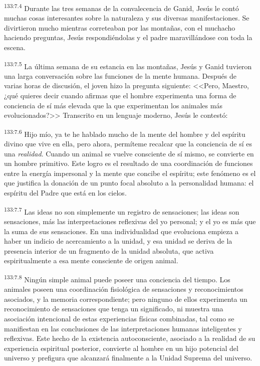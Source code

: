 \par 
\textsuperscript{133:7.4} Durante las tres semanas de la convalecencia de Ganid, Jesús le contó muchas cosas interesantes sobre la naturaleza y sus diversas manifestaciones. Se divirtieron mucho mientras correteaban por las montañas, con el muchacho haciendo preguntas, Jesús respondiéndolas y el padre maravillándose con toda la escena.

\par 
\textsuperscript{133:7.5} La última semana de su estancia en las montañas, Jesús y Ganid tuvieron una larga conversación sobre las funciones de la mente humana. Después de varias horas de discusión, el joven hizo la pregunta siguiente: <<Pero, Maestro, ¿qué quieres decir cuando afirmas que el hombre experimenta una forma de conciencia de sí más elevada que la que experimentan los animales más evolucionados?>> Transcrito en un lenguaje moderno, Jesús le contestó:

\par 
\textsuperscript{133:7.6} Hijo mío, ya te he hablado mucho de la mente del hombre y del espíritu divino que vive en ella, pero ahora, permíteme recalcar que la conciencia de sí es una \textit{realidad}. Cuando un animal se vuelve consciente de sí mismo, se convierte en un hombre primitivo. Este logro es el resultado de una coordinación de funciones entre la energía impersonal y la mente que concibe el espíritu; este fenómeno es el que justifica la donación de un punto focal absoluto a la personalidad humana: el espíritu del Padre que está en los cielos.

\par 
\textsuperscript{133:7.7} Las ideas no son simplemente un registro de sensaciones; las ideas son sensaciones, más las interpretaciones reflexivas del yo personal; y el yo es más que la suma de sus sensaciones. En una individualidad que evoluciona empieza a haber un indicio de acercamiento a la unidad, y esa unidad se deriva de la presencia interior de un fragmento de la unidad absoluta, que activa espiritualmente a esa mente consciente de origen animal.

\par 
\textsuperscript{133:7.8} Ningún simple animal puede poseer una conciencia del tiempo. Los animales poseen una coordinación fisiológica de sensaciones y reconocimientos asociados, y la memoria correspondiente; pero ninguno de ellos experimenta un reconocimiento de sensaciones que tenga un significado, ni muestra una asociación intencional de estas experiencias físicas combinadas, tal como se manifiestan en las conclusiones de las interpretaciones humanas inteligentes y reflexivas. Este hecho de la existencia autoconsciente, asociado a la realidad de su experiencia espiritual posterior, convierte al hombre en un hijo potencial del universo y prefigura que alcanzará finalmente a la Unidad Suprema del universo.

